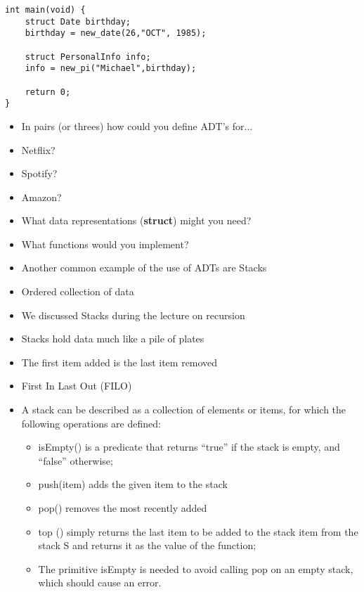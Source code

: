 \documentclass{beamer}
\begin{document}
\begin{frame}[fragile]
\begin{block}{}
\begin{lstlisting}
int main(void) {	
    struct Date birthday;
    birthday = new_date(26,"OCT", 1985);
    
    struct PersonalInfo info;
    info = new_pi("Michael",birthday);

    return 0;
}
\end{lstlisting}
\end{block}
\end{frame}

\begin{frame}
\begin{itemize}
\item In pairs (or threes) how could you define ADT's for...
\item Netflix?
\item Spotify?
\item Amazon?
\bigskip
\item What data representations (\textbf{struct}) might you need?
\item What functions would you implement?
\end{itemize}
\end{frame}

\begin{frame}
\begin{itemize}
\item Another common example of the use of ADTs are Stacks
\bigskip
\item Ordered collection of data
\item We discussed Stacks during the lecture on recursion
\item Stacks hold data much like a pile of plates
\item The first item added is the last item removed
\item First In Last Out (FILO)
\end{itemize}
\end{frame}

\begin{frame}
\begin{itemize}
\item A stack can be described as a collection of elements or items, for which the following operations are defined:
\begin{itemize}
\item isEmpty() is a predicate that returns ``true'' if the stack is empty, and ``false'' otherwise;
\item push(item) adds the given item to the stack
\item pop() removes the most recently added
\item top () simply returns the last item to be added to the stack item from the stack S and returns it as the value of
the function;
\item The primitive isEmpty is needed to avoid calling pop on an empty stack, which should cause an error.
\end{itemize}
\end{itemize}
\end{frame}
\end{document}
